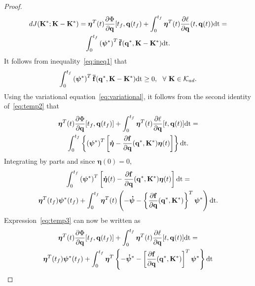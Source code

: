\documentclass[
12pt,draftcls,onecolumn%
]{IEEEtran}
\begin{document}
\begin{proof}
\begin{multline}
dJ({\bf K}^*;{\bf K}-{\bf K}^*) = \boldsymbol{\eta}^T(t) \frac{\partial\Phi}{\partial{\bf q}}[t_f,{\bf q}(t_f) +
\int_{0}^{t_f}\boldsymbol{\eta}^T(t)\frac{\partial\ell}{\partial{\bf q}}(t,{\bf q}(t))\mathrm{dt}=\\
\int_{0}^{t_f} \left(\boldsymbol{\psi}^*\right)^T{\bf \bar f}({\bf q}^*,{\bf K}-{\bf K}^*)\mathrm{dt}.
\label{eq:temp2}
\end{multline}
It follows from inequality~\eqref{eq:ineq1} that 
\begin{equation}
\int_{0}^{t_f} \left(\boldsymbol{\psi}^*\right)^T{\bf \bar f}({\bf q}^*,{\bf K}-{\bf K}^*)\mathrm{dt} \geq 0,~~\forall~{\bf K}\in {\cal K}_{ad}.
\label{eq:ineq2}
\end{equation}
Using the variational equation~\eqref{eq:variational}, it follows from the second identity of~\eqref{eq:temp2} that
\begin{multline}
\boldsymbol{\eta}^T(t)\frac{\partial\Phi}{\partial{\bf q}}[t_f,{\bf q}(t_f)] +\int_{0}^{t_f}\boldsymbol{\eta}^T(t) \frac{\partial\ell}{\partial{\bf q}} [t,{\bf q}(t)]\mathrm{dt}=\\
\int_{0}^{t_f}\left\{\left(\boldsymbol{\psi}^*\right)^T\left[\boldsymbol{\dot\eta}-\frac{\partial{\bf f}}{\partial{\bf q}}({\bf q}^*,{\bf K}^*) \boldsymbol{\eta}(t)\right]\right\}\mathrm{dt}.
\label{eq:temp3}
\end{multline}
Integrating by parts and since $\boldsymbol{\eta}(0) = 0$, 
\begin{multline*}
\int_{0}^{t_f}\left(\boldsymbol{\psi}^*\right)^T\left[\boldsymbol{\dot\eta}(t)-\frac{\partial{\bf f}}{\partial{\bf q}}({\bf q}^*,{\bf K}^*)\boldsymbol{\eta}(t)\right]\mathrm{dt}=\\
\boldsymbol{\eta}^T(t_f)\boldsymbol{\psi}^*(t_f) + \int_{0}^{t_f}\boldsymbol{\eta}^T(t)\left(-\boldsymbol{\dot\psi}-\left\{\frac{\partial{\bf f}}{\partial{\bf q}}({\bf q}^*,{\bf K}^*)\right\}^T\boldsymbol{\psi}^*\right)\mathrm{dt}.
\end{multline*}
%
Expression~\eqref{eq:temp3} can now be written as
\begin{multline}
\boldsymbol{\eta}^T(t)\frac{\partial\Phi}{\partial{\bf q}}[t_f,{\bf q}(t_f)] +\int_{0}^{t_f}\boldsymbol{\eta}^T(t) \frac{\partial\ell}{\partial{\bf q}} [t,{\bf q}(t)]\mathrm{dt}=\\
\boldsymbol{\eta}^T(t_f)\boldsymbol{\psi}^*(t_f) + \int_{0}^{t_f}\boldsymbol{\eta}^T\left\{-\boldsymbol{\dot\psi}^*-\left[\frac{\partial{\bf f}}{\partial{\bf q}}({\bf q}^*,{\bf K}^*)\right]^T\boldsymbol{\psi}^*\right\}\mathrm{dt}

\end{multline}
\end{proof}
\end{document}
